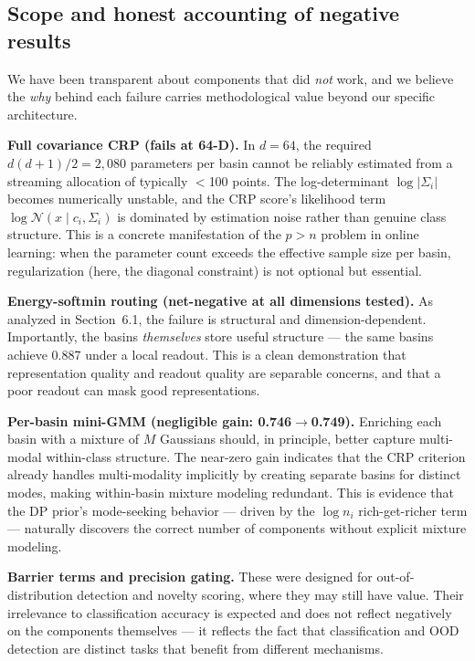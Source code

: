 \documentclass[11pt,a4paper]{article}
\begin{document}
\subsection{Scope and honest accounting of negative results}

We have been transparent about components that did \textit{not} work, and we believe the \textit{why} behind each failure carries methodological value beyond our specific architecture.

\textbf{Full covariance CRP (fails at 64-D).} In $d=64$, the required $d(d+1)/2 = 2,080$ parameters per basin cannot be reliably estimated from a streaming allocation of typically $<$100 points. The log-determinant $\log|\Sigma_i|$ becomes numerically unstable, and the CRP score's likelihood term $\log\mathcal{N}(x\mid c_i,\Sigma_i)$ is dominated by estimation noise rather than genuine class structure. This is a concrete manifestation of the $p > n$ problem in online learning: when the parameter count exceeds the effective sample size per basin, regularization (here, the diagonal constraint) is not optional but essential.

\textbf{Energy-softmin routing (net-negative at all dimensions tested).} As analyzed in Section~6.1, the failure is structural and dimension-dependent. Importantly, the basins \textit{themselves} store useful structure --- the same basins achieve 0.887 under a local readout. This is a clean demonstration that representation quality and readout quality are separable concerns, and that a poor readout can mask good representations.

\textbf{Per-basin mini-GMM (negligible gain: 0.746$\to$0.749).} Enriching each basin with a mixture of $M$ Gaussians should, in principle, better capture multi-modal within-class structure. The near-zero gain indicates that the CRP criterion already handles multi-modality implicitly by creating separate basins for distinct modes, making within-basin mixture modeling redundant. This is evidence that the DP prior's mode-seeking behavior --- driven by the $\log n_i$ rich-get-richer term --- naturally discovers the correct number of components without explicit mixture modeling.

\textbf{Barrier terms and precision gating.} These were designed for out-of-distribution detection and novelty scoring, where they may still have value. Their irrelevance to classification accuracy is expected and does not reflect negatively on the components themselves --- it reflects the fact that classification and OOD detection are distinct tasks that benefit from different mechanisms.
\end{document}
